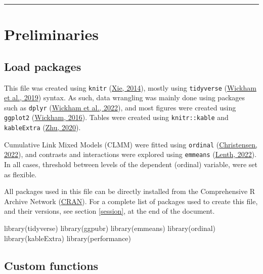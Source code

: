 \documentclass[
  bookmarksnumbered]{article}
\newenvironment{Shaded}{\begin{snugshade}}{\end{snugshade}}
\newcommand{\FunctionTok}[1]{\textcolor[rgb]{0.94,0.94,0.56}{#1}}
\newcommand{\NormalTok}[1]{\textcolor[rgb]{0.80,0.80,0.80}{#1}}
\begin{document}
\begin{center}\rule{0.5\linewidth}{0.5pt}\end{center}

\hypertarget{preliminaries}{%
\section{Preliminaries}\label{preliminaries}}

\hypertarget{load-packages}{%
\subsection{Load packages}\label{load-packages}}

This file was created using \texttt{knitr} (\protect\hyperlink{ref-knitrcit}{Xie, 2014}), mostly using \texttt{tidyverse} (\protect\hyperlink{ref-tidyversecit}{Wickham et al., 2019}) syntax. As such, data wrangling was mainly done using packages such as \texttt{dplyr} (\protect\hyperlink{ref-dplyrcit}{Wickham et al., 2022}), and most figures were created using \texttt{ggplot2} (\protect\hyperlink{ref-ggplotcit}{Wickham, 2016}). Tables were created using \texttt{knitr::kable} and \texttt{kableExtra} (\protect\hyperlink{ref-kableExtracit}{Zhu, 2020}).

Cumulative Link Mixed Models (CLMM) were fitted using \texttt{ordinal} (\protect\hyperlink{ref-ordinalcit}{Christensen, 2022}), and contrasts and interactions were explored using \texttt{emmeans} (\protect\hyperlink{ref-emmeanscit}{Lenth, 2022}). In all cases, threshold between levels of the dependent (ordinal) variable, were set as flexible.

All packages used in this file can be directly installed from the Comprehensive R Archive Network (\href{https://cran.r-project.org/}{CRAN}). For a complete list of packages used to create this file, and their versions, see section \ref{session}, at the end of the document.

\begin{Shaded}
\begin{Highlighting}[]
\FunctionTok{library}\NormalTok{(tidyverse)}
\FunctionTok{library}\NormalTok{(ggpubr)}
\FunctionTok{library}\NormalTok{(emmeans)}
\FunctionTok{library}\NormalTok{(ordinal)}
\FunctionTok{library}\NormalTok{(kableExtra)}
\FunctionTok{library}\NormalTok{(performance)}
\end{Highlighting}
\end{Shaded}

\hypertarget{custom-functions}{%
\subsection{Custom functions}\label{custom-functions}}
\end{document}
